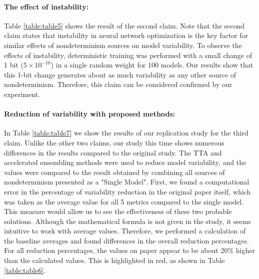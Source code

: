 \paragraph{The effect of instability:}
Table \ref{table:table5} shows the result of the second claim. Note that the second claim states that instability in neural network optimization is the key factor for similar effects of nondeterminism sources on model variability. To observe the effects of instability, deterministic training was performed with a small change of 1 bit ($5\times 10^{-10}$) in a single random weight for $100$ models. Our results show that this 1-bit change generates about as much variability as any other source of nondeterminism. Therefore, this claim can be considered confirmed by our experiment.

\begin{table}[!htb]
\centering
{}
	\caption{Effects of instability}
	\label{table:table5}
\end{table}

\paragraph{Reduction of variability with proposed methods:}
In Table \ref{table:table7} we show the results of our replication study for the third claim. Unlike the other two claims, our study this time shows numerous differences in the results compared to the original study. The TTA and accelerated ensembling methods were used to reduce model variability, and the values were compared to the result obtained by combining all sources of nondeterminism presented as a "Single Model". First, we found a computational error in the percentage of variability reduction in the original paper itself, which was taken as the average value for all 5 metrics compared to the single model. This measure would allow us to see the effectiveness of these two probable solutions. Although the mathematical formula is not given in the study, it seems intuitive to work with average values. Therefore, we performed a calculation of the baseline averages and found differences in the overall reduction percentages. For all reduction percentages, the values on paper appear to be about $20\%$ higher than the calculated values. This is highlighted in red, as shown in Table \ref{table:table6}. 

